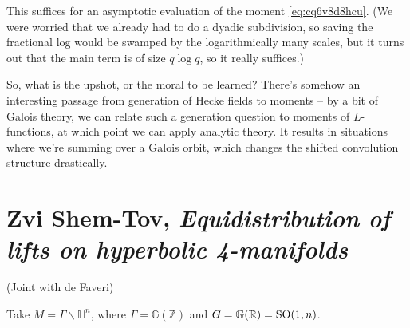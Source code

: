 \documentclass[reqno]{amsart} 
\begin{document}
This suffices for an asymptotic evaluation of the moment \eqref{eq:cq6v8d8hcu}.  (We were worried that we already had to do a dyadic subdivision, so saving the fractional log would be swamped by the logarithmically many scales, but it turns out that the main term is of size $q \log q$, so it really suffices.)

So, what is the upshot, or the moral to be learned?  There's somehow an interesting passage from generation of Hecke fields to moments -- by a bit of Galois theory, we can relate such a generation question to moments of $L$-functions, at which point we can apply analytic theory.  It results in situations where we're summing over a Galois orbit, which changes the shifted convolution structure drastically.

\section{Zvi Shem-Tov, \emph{Equidistribution of lifts on hyperbolic 4-manifolds}}

(Joint with de Faveri)

Take $M = \Gamma \backslash \mathbb{H}^n$, where $\Gamma = \mathbb{G}(\mathbb{Z})$ and $G = \mathbb{G}(\mathbb{R}) = \operatorname{SO}(1, n)$.
\end{document}
